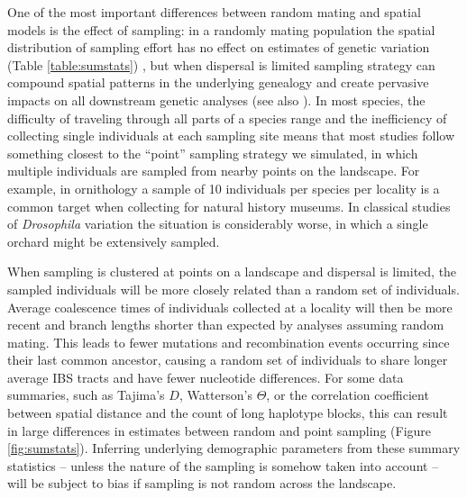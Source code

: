 \documentclass[10pt,twoside,lineno,hidelinks]{preprint}
\begin{document}
One of the most important differences between random mating and spatial models is the effect of sampling: 
in a randomly mating population the spatial distribution of sampling effort has no effect on estimates of genetic variation (Table \ref{table:sumstats}) , 
but when dispersal is limited sampling strategy can compound spatial patterns in the underlying genealogy and create pervasive impacts on all downstream genetic analyses (see also \citet{Stadler2009}). 
In most species,
the difficulty of traveling through all parts of a species range and the inefficiency of collecting single individuals at each sampling site 
means that most studies follow something closest to the ``point'' sampling strategy we simulated, 
in which multiple individuals are sampled from nearby points on the landscape. 
For example, in ornithology a sample of 10 individuals per species per locality is a common target when collecting for natural history museums. 
In classical studies of \textit{Drosophila} variation the situation is considerably worse, in which a single orchard might be extensively sampled.

When sampling is clustered at points on a landscape and dispersal is limited, the sampled individuals will be more closely related than a random set of individuals. Average coalescence times of individuals collected at a locality will then be more recent and branch lengths shorter than expected by analyses assuming random mating. This leads to fewer mutations and recombination events occurring since their last common ancestor, causing a random set of individuals to share longer average IBS tracts and have fewer nucleotide differences. For some data summaries, such as Tajima's $D$, Watterson's $\Theta$, or the correlation coefficient between spatial distance and the count of long haplotype blocks, this can result in large differences in estimates between random and point sampling (Figure \ref{fig:sumstats}). 
Inferring underlying demographic parameters from these summary statistics 
-- unless the nature of the sampling is somehow taken into account 
-- will be subject to bias if sampling is not random across the landscape. 
\end{document}
